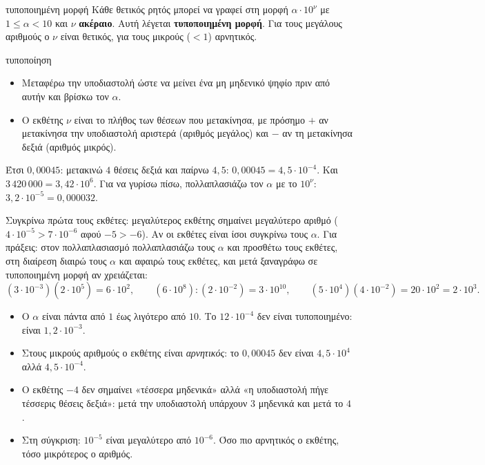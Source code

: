 
\begin{orismos}{τυποποιημένη μορφή}
Κάθε θετικός ρητός μπορεί να γραφεί στη μορφή $\alpha\cdot10^{\nu}$ με $1\le\alpha<10$ και $\nu$ \textbf{ακέραιο}. Αυτή λέγεται \textbf{τυποποιημένη μορφή}. Για τους μεγάλους αριθμούς ο $\nu$ είναι θετικός, για τους μικρούς ($<1$) αρνητικός.
\end{orismos}

\begin{kanonas}{τυποποίηση}
\begin{itemize}[leftmargin=1.2em,itemsep=0.3ex,topsep=2pt]
\item Μεταφέρω την υποδιαστολή ώστε να μείνει ένα μη μηδενικό ψηφίο πριν από αυτήν και βρίσκω τον $\alpha$.
\item Ο εκθέτης $\nu$ είναι το πλήθος των θέσεων που μετακίνησα, με πρόσημο $+$ αν μετακίνησα την υποδιαστολή αριστερά (αριθμός μεγάλος) και $-$ αν τη μετακίνησα δεξιά (αριθμός μικρός).
\end{itemize}
\end{kanonas}

Έτσι $0{,}00045$: μετακινώ $4$ θέσεις δεξιά και παίρνω $4{,}5$: $0{,}00045=4{,}5\cdot10^{-4}$. Και $3\,420\,000=3{,}42\cdot10^{6}$. Για να γυρίσω πίσω, πολλαπλασιάζω τον $\alpha$ με το $10^\nu$: $3{,}2\cdot10^{-5}=0{,}000032$.


Συγκρίνω πρώτα τους εκθέτες: μεγαλύτερος εκθέτης σημαίνει μεγαλύτερο αριθμό ($4\cdot10^{-5}>7\cdot10^{-6}$ αφού $-5>-6$). Αν οι εκθέτες είναι ίσοι συγκρίνω τους $\alpha$. Για πράξεις: στον πολλαπλασιασμό πολλαπλασιάζω τους $\alpha$ και προσθέτω τους εκθέτες, στη διαίρεση διαιρώ τους $\alpha$ και αφαιρώ τους εκθέτες, και μετά ξαναγράφω σε τυποποιημένη μορφή αν χρειάζεται:
$$(3\cdot10^{-3})(2\cdot10^{5})=6\cdot10^{2},\qquad(6\cdot10^{8}):(2\cdot10^{-2})=3\cdot10^{10},\qquad(5\cdot10^{4})(4\cdot10^{-2})=20\cdot10^{2}=2\cdot10^{3}.$$

\begin{prosoxi}
\begin{itemize}[leftmargin=1.2em,itemsep=0.3ex,topsep=2pt]
\item Ο $\alpha$ είναι πάντα από $1$ έως λιγότερο από $10$. Το $12\cdot10^{-4}$ δεν είναι τυποποιημένο: είναι $1{,}2\cdot10^{-3}$.
\item Στους μικρούς αριθμούς ο εκθέτης είναι \emph{αρνητικός}: το $0{,}00045$ δεν είναι $4{,}5\cdot10^{4}$ αλλά $4{,}5\cdot10^{-4}$.
\item Ο εκθέτης $-4$ δεν σημαίνει «τέσσερα μηδενικά» αλλά «η υποδιαστολή πήγε τέσσερις θέσεις δεξιά»: μετά την υποδιαστολή υπάρχουν $3$ μηδενικά και μετά το $4$.
\item Στη σύγκριση: $10^{-5}$ είναι μεγαλύτερο από $10^{-6}$. Όσο πιο αρνητικός ο εκθέτης, τόσο μικρότερος ο αριθμός.
\end{itemize}
\end{prosoxi}

